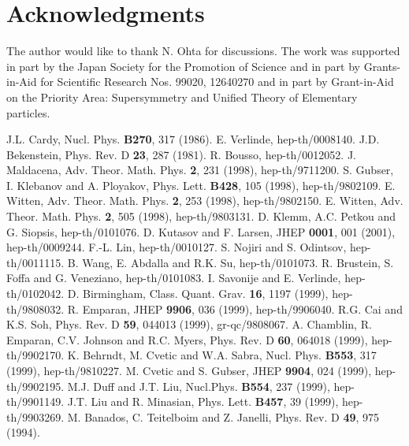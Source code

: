 \documentclass[a4paper,12pt]{article}
\begin{document}
\section*{Acknowledgments}

The author would like to thank N. Ohta for discussions. 
The work  was supported in part by the Japan Society for the 
Promotion of Science and in part by Grants-in-Aid for Scientific Research
Nos. 99020, 12640270 and in part by Grant-in-Aid on the Priority Area:
Supersymmetry and Unified Theory of Elementary particles.  


\begin{thebibliography}{99}
J.L. Cardy, Nucl. Phys. {\bf B270}, 317 (1986).
E. Verlinde, hep-th/0008140.
J.D. Bekenstein, Phys. Rev. D {\bf 23}, 287 (1981).
R. Bousso, hep-th/0012052.
J. Maldacena, Adv. Theor. Math. Phys. {\bf 2}, 231 (1998),
              hep-th/9711200.
S. Gubser, I. Klebanov and A. Ployakov, Phys. Lett.
    {\bf B428}, 105 (1998), hep-th/9802109.
E. Witten, Adv. Theor. Math. Phys. {\bf 2}, 253 (1998),
     hep-th/9802150. 
E. Witten, Adv. Theor. Math. Phys. {\bf 2}, 505 (1998),
     hep-th/9803131.
D. Klemm, A.C. Petkou and G. Siopsis, hep-th/0101076.
D. Kutasov and F. Larsen, JHEP {\bf 0001}, 001 (2001),
             hep-th/0009244.
 F.-L. Lin, hep-th/0010127.
S. Nojiri and S. Odintsov, hep-th/0011115.
B. Wang, E. Abdalla and R.K. Su, hep-th/0101073.
R. Brustein, S. Foffa and G. Veneziano, hep-th/0101083.
I. Savonije and E. Verlinde, hep-th/0102042.
 D. Birmingham, Class. Quant. Grav. {\bf 16}, 1197 (1999),
               hep-th/9808032.
R. Emparan, JHEP {\bf 9906}, 036 (1999), hep-th/9906040.
R.G. Cai and K.S. Soh, Phys. Rev. D {\bf 59}, 044013 (1999),
          gr-qc/9808067.
A. Chamblin, R. Emparan, C.V. Johnson and R.C. Myers,
    Phys. Rev. D {\bf 60}, 064018 (1999), hep-th/9902170.
K. Behrndt, M. Cvetic and W.A. Sabra, Nucl. Phys. {\bf B553},
    317 (1999), hep-th/9810227.
 M. Cvetic and S. Gubser, JHEP {\bf 9904}, 024 (1999),
        hep-th/9902195.
M.J. Duff and J.T. Liu, Nucl.Phys. {\bf B554}, 237 (1999),
     hep-th/9901149.
J.T. Liu and R. Minasian, Phys. Lett. {\bf B457}, 39 (1999),
         hep-th/9903269.
M. Banados, C. Teitelboim and Z. Janelli, Phys. Rev. D {\bf 49},
    975 (1994).
\end{thebibliography}
\end{document}

